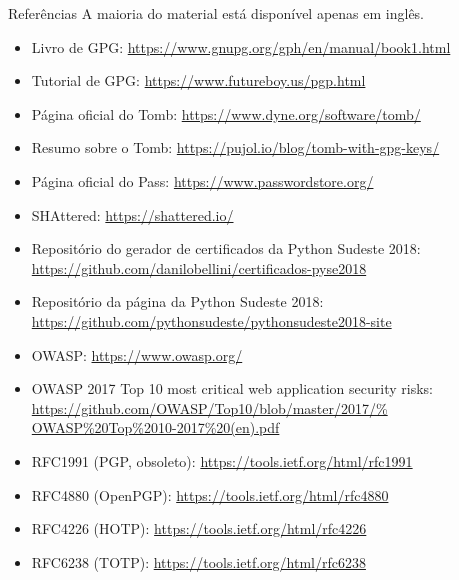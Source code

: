 \documentclass[utf8]{beamer}
\begin{document}
\begin{frame}{Referências}
  \fontsize{9pt}{9pt}\selectfont
  A maioria do material está disponível apenas em inglês.
  \begin{itemize}
    \item Livro de GPG:
          \url{https://www.gnupg.org/gph/en/manual/book1.html}
    \item Tutorial de GPG:
          \url{https://www.futureboy.us/pgp.html}
    \item Página oficial do Tomb:
          \url{https://www.dyne.org/software/tomb/}
    \item Resumo sobre o Tomb:
          \url{https://pujol.io/blog/tomb-with-gpg-keys/}
    \item Página oficial do Pass:
          \url{https://www.passwordstore.org/}
    \item SHAttered:
          \url{https://shattered.io/}
    \item Repositório do gerador de certificados
          da Python Sudeste 2018:
          \url{https://github.com/danilobellini/certificados-pyse2018}
    \item Repositório da página da Python Sudeste 2018:
          \url{https://github.com/pythonsudeste/pythonsudeste2018-site}
    \item OWASP:
          \url{https://www.owasp.org/}
    \item OWASP 2017
          Top 10 most critical web application security risks:
          \url{https://github.com/OWASP/Top10/blob/master/2017/%
               OWASP\%20Top\%2010-2017\%20(en).pdf}
    \item RFC1991 (PGP, obsoleto):
          \url{https://tools.ietf.org/html/rfc1991}
    \item RFC4880 (OpenPGP):
          \url{https://tools.ietf.org/html/rfc4880}
    \item RFC4226 (HOTP):
          \url{https://tools.ietf.org/html/rfc4226}
    \item RFC6238 (TOTP):
          \url{https://tools.ietf.org/html/rfc6238}
  \end{itemize}
  \vfill{}
\end{frame}
\end{document}
